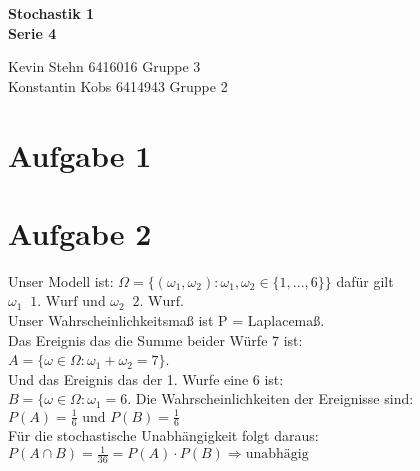 \documentclass[10pt,a4paper]{article}
\newcommand{\ent}{\mathop{\widehat{=}}}
\newcommand{\w}{\omega}
\begin{document}
\begin{center}
\textbf{Stochastik 1 \\ Serie 4 \\}
\end{center}

\begin{flushright}
Kevin Stehn 6416016 Gruppe 3 \\
Konstantin Kobs 6414943 Gruppe 2
\end{flushright}

\section*{Aufgabe 1}

\section*{Aufgabe 2}
Unser Modell ist: $\Omega = \{(\w_1,\w_2) : \w_1,\w_2 \in \{1,...,6\} \}$ daf\"ur gilt\\
$\omega_1 \ent \text{1. Wurf}$ und $\w_2 \ent \text{2. Wurf}$.\\
Unser Wahrscheinlichkeitsmaß ist P = Laplacemaß.\\
Das Ereignis das die Summe beider W\"urfe 7 ist:\\
$A = \{\w \in \Omega : \w_1 + \w_2 = 7 \}$.\\
Und das Ereignis das der 1. Wurfe eine 6 ist:\\
$B = \{\w \in \Omega : \w_1 = 6$.
Die Wahrscheinlichkeiten der Ereignisse sind:\\
$P(A) = \frac{1}{6} \text{ und } P(B) = \frac{1}{6}$ \\
F\"ur die stochastische Unabh\"angigkeit folgt daraus:\\
$P(A \cap B) = \frac{1}{36} = P(A) \cdot P(B) \Rightarrow \text{unabh\"agig}$
\end{document}

